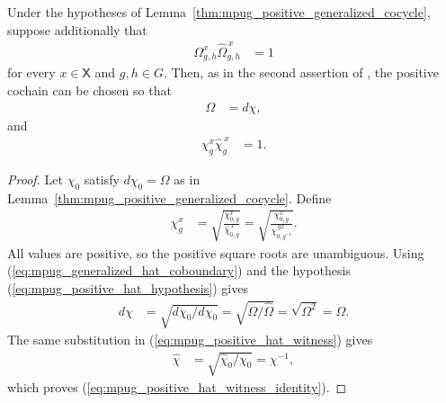 \begin{lemma}
    \label{thm:mpug_positive_generalized_cocycle_hat}
    \leanok
    Under the hypotheses of
    Lemma~\ref{thm:mpug_positive_generalized_cocycle}, suppose additionally
    that
    \begin{align}
        \Omega^x_{g,h}\widehat\Omega^{\,x}_{g,h}
         & =1
        \label{eq:mpug_positive_hat_hypothesis}
    \end{align}
    for every $x\in\mathsf X$ and $g,h\in G$. Then, as in the second assertion
    of \cite[Corollary at lines~5950--5960]{FrancoRubio2025MPUGauging}, the
    positive cochain can be chosen so that
    \begin{align}
        \Omega & =d\chi,
        \label{eq:mpug_positive_hat_coboundary}
    \end{align}
    and
    \begin{align}
        \chi^x_g\widehat\chi^{\,x}_g
         & =1.
        \label{eq:mpug_positive_hat_witness_identity}
    \end{align}
\end{lemma}

\begin{proof}\leanok
    Let $\chi_0$ satisfy $d\chi_0=\Omega$ as in
    Lemma~\ref{thm:mpug_positive_generalized_cocycle}. Define
    \begin{align}
        \chi^x_g
         & =\sqrt{\frac{\chi^x_{0,g}}
            {\widehat\chi^{\,x}_{0,g}}}
        =\sqrt{\frac{\chi^x_{0,g}}
            {\chi^{\,g x}_{0,g^{-1}}}}.
        \label{eq:mpug_positive_hat_witness}
    \end{align}
    All values are positive, so the positive square roots are unambiguous.
    Using (\ref{eq:mpug_generalized_hat_coboundary}) and the hypothesis
    (\ref{eq:mpug_positive_hat_hypothesis}) gives
    \begin{align}
        d\chi
         & =\sqrt{d\chi_0/d\widehat\chi_0}
        =\sqrt{\Omega/\widehat\Omega}
        =\sqrt{\Omega^2}
        =\Omega.
    \end{align}
    The same substitution in
    (\ref{eq:mpug_positive_hat_witness}) gives
    \begin{align}
        \widehat\chi
         & =\sqrt{\widehat\chi_0/\chi_0}
        =\chi^{-1},
    \end{align}
    which proves
    (\ref{eq:mpug_positive_hat_witness_identity}).
\end{proof}

